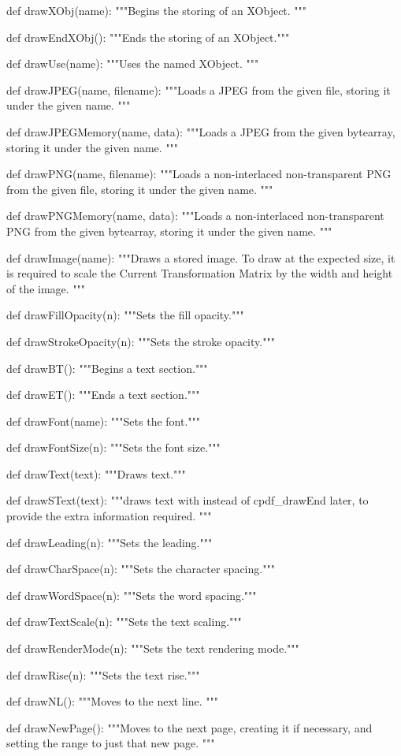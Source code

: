 def drawXObj(name):
    """Begins the storing of an XObject. """

def drawEndXObj():
    """Ends the storing of an XObject."""

def drawUse(name):
    """Uses the named XObject. """

def drawJPEG(name, filename):
    """Loads a JPEG from the given file, storing it under the given name. """

def drawJPEGMemory(name, data):
    """Loads a JPEG from the given bytearray, storing it under the given name.
    """

def drawPNG(name, filename):
    """Loads a non-interlaced non-transparent PNG from the given file, storing
    it under the given name. """

def drawPNGMemory(name, data):
    """Loads a non-interlaced non-transparent PNG from the given bytearray,
    storing it under the given name. """

def drawImage(name):
    """Draws a stored image. To draw at the expected size, it is required to
    scale the Current Transformation Matrix by the width and height of the
    image. """

def drawFillOpacity(n):
    """Sets the fill opacity."""

def drawStrokeOpacity(n):
    """Sets the stroke opacity."""

def drawBT():
    """Begins a text section."""

def drawET():
    """Ends a text section."""

def drawFont(name):
    """Sets the font."""

def drawFontSize(n):
    """Sets the font size."""

def drawText(text):
    """Draws text."""

def drawSText(text):
    """draws text with %
    instead of cpdf_drawEnd later, to provide the extra information required.
    """

def drawLeading(n):
    """Sets the leading."""

def drawCharSpace(n):
    """Sets the character spacing."""

def drawWordSpace(n):
    """Sets the word spacing."""

def drawTextScale(n):
    """Sets the text scaling."""

def drawRenderMode(n):
    """Sets the text rendering mode."""

def drawRise(n):
    """Sets the text rise."""

def drawNL():
    """Moves to the next line. """

def drawNewPage():
    """Moves to the next page, creating it if necessary, and setting the range
    to just that new page. """
